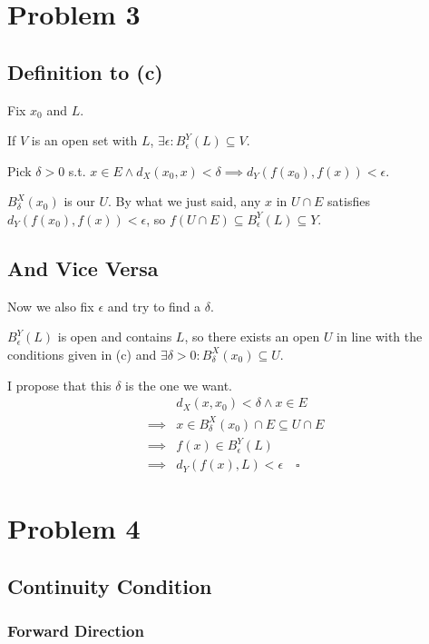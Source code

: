 \documentclass[12pt]{article}
\begin{document}
\section{Problem 3}

\subsection{Definition to (c)}

Fix $x_0$ and $L$.

If $V$ is an open set with $L$, $\exists \epsilon: B_\epsilon^Y(L) \subseteq V$.

Pick $\delta > 0$ s.t. $x \in E \land d_X(x_0, x) < \delta \implies d_Y(f(x_0), f(x)) < \epsilon$.

$B_\delta^X(x_0)$ is our $U$.
By what we just said, any $x$ in $U \cap E$ satisfies $d_Y(f(x_0), f(x)) < \epsilon$,
so $f(U \cap E) \subseteq B_\epsilon^Y(L) \subseteq Y$.

\subsection{And Vice Versa}

Now we also fix $\epsilon$ and try to find a $\delta$.

$B_\epsilon^Y(L)$ is open and contains $L$, so there exists an open $U$ in line with
the conditions given in (c) and $\exists \delta > 0: B_\delta^X(x_0) \subseteq U$.

I propose that this $\delta$ is the one we want.
\begin{align*}
             & d_X(x, x_0) < \delta \land x \in E              \\
  \implies{} & x \in B_\delta^X(x_0) \cap E \subseteq U \cap E \\
  \implies{} & f(x) \in B_\epsilon^Y(L)                        \\
  \implies{} & d_Y(f(x), L) < \epsilon\quad\square
\end{align*}

\pagebreak

\section{Problem 4}

\subsection{Continuity Condition}

\subsubsection{Forward Direction}\label{sec:prob4p1}
\end{document}
